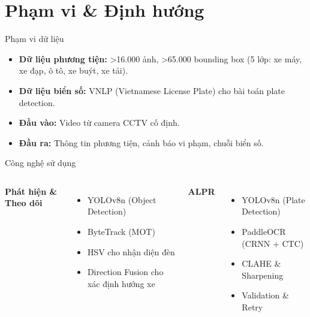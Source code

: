 ﻿%

\section{Phạm vi \& Định hướng}

\begin{frame}{Phạm vi dữ liệu}
    \begin{itemize}
        \item \textbf{Dữ liệu phương tiện:} >16.000 ảnh, >65.000 bounding box (5 lớp: xe máy, xe đạp, ô tô, xe buýt, xe tải).
        \item \textbf{Dữ liệu biển số:} VNLP (Vietnamese License Plate) cho bài toán plate detection.
        \item \textbf{Đầu vào:} Video từ camera CCTV cố định.
        \item \textbf{Đầu ra:} Thông tin phương tiện, cảnh báo vi phạm, chuỗi biển số.
    \end{itemize}
\end{frame}

\begin{frame}{Công nghệ sử dụng}
    \begin{columns}
        \textbf{Phát hiện \& Theo dõi}
        \begin{itemize}
            \item YOLOv8n (Object Detection)
            \item ByteTrack (MOT)
            \item HSV cho nhận diện đèn
            \item Direction Fusion cho xác định hướng xe
        \end{itemize}

        \textbf{ALPR}
        \begin{itemize}
            \item YOLOv8n (Plate Detection)
            \item PaddleOCR (CRNN + CTC)
            \item CLAHE \& Sharpening
            \item Validation \& Retry
        \end{itemize}
    \end{columns}
\end{frame}

